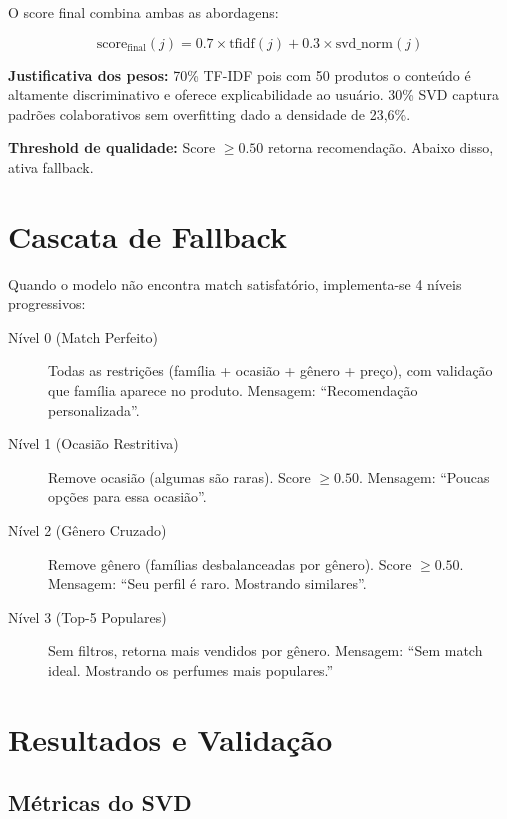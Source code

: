 \documentclass[12pt,a4paper]{article}
\begin{document}
O score final combina ambas as abordagens:

\begin{equation}
\text{score}_{\text{final}}(j) = 0.7 \times \text{tfidf}(j) + 0.3 \times \text{svd\_norm}(j)
\end{equation}

\textbf{Justificativa dos pesos:} 70\% TF-IDF pois com 50 produtos o conteúdo é altamente discriminativo e oferece explicabilidade ao usuário. 30\% SVD captura padrões colaborativos sem overfitting dado a densidade de 23,6\%.

\textbf{Threshold de qualidade:} Score $\geq 0.50$ retorna recomendação. Abaixo disso, ativa fallback.

\section{Cascata de Fallback}

Quando o modelo não encontra match satisfatório, implementa-se 4 níveis progressivos:

\begin{description}
    \item[Nível 0 (Match Perfeito)] Todas as restrições (família + ocasião + gênero + preço), com validação que família aparece no produto. Mensagem: ``Recomendação personalizada''.

    \item[Nível 1 (Ocasião Restritiva)] Remove ocasião (algumas são raras). Score $\geq 0.50$. Mensagem: ``Poucas opções para essa ocasião''.

    \item[Nível 2 (Gênero Cruzado)] Remove gênero (famílias desbalanceadas por gênero). Score $\geq 0.50$. Mensagem: ``Seu perfil é raro. Mostrando similares''.

    \item[Nível 3 (Top-5 Populares)] Sem filtros, retorna mais vendidos por gênero. Mensagem: ``Sem match ideal. Mostrando os perfumes mais populares.''
\end{description}

\section{Resultados e Validação}

\subsection{Métricas do SVD}
\end{document}
